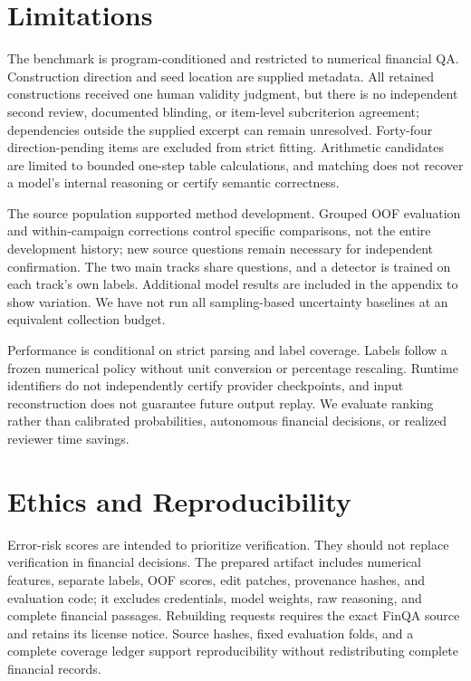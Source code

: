 \section*{Limitations}
The benchmark is program-conditioned and restricted to numerical financial QA. Construction direction and seed location are supplied metadata. All retained constructions received one human validity judgment, but there is no independent second review, documented blinding, or item-level subcriterion agreement; dependencies outside the supplied excerpt can remain unresolved. Forty-four direction-pending items are excluded from strict fitting. Arithmetic candidates are limited to bounded one-step table calculations, and matching does not recover a model's internal reasoning or certify semantic correctness.

The source population supported method development. Grouped OOF evaluation and within-campaign corrections control specific comparisons, not the entire development history; new source questions remain necessary for independent confirmation. The two main tracks share questions, and a detector is trained on each track's own labels. Additional model results are included in the appendix to show variation. We have not run all sampling-based uncertainty baselines at an equivalent collection budget.

Performance is conditional on strict parsing and label coverage. Labels follow a frozen numerical policy without unit conversion or percentage rescaling. Runtime identifiers do not independently certify provider checkpoints, and input reconstruction does not guarantee future output replay. We evaluate ranking rather than calibrated probabilities, autonomous financial decisions, or realized reviewer time savings.

\section*{Ethics and Reproducibility}
Error-risk scores are intended to prioritize verification. They should not replace verification in financial decisions. The prepared artifact includes numerical features, separate labels, OOF scores, edit patches, provenance hashes, and evaluation code; it excludes credentials, model weights, raw reasoning, and complete financial passages. Rebuilding requests requires the exact FinQA source and retains its license notice. Source hashes, fixed evaluation folds, and a complete coverage ledger support reproducibility without redistributing complete financial records.

